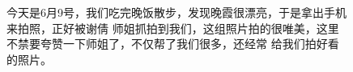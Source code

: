 \documentclass[cn,11pt,chinese]{elegantbook}
\begin{document}
\begin{figure}
    \caption{今天是6月9号，我们吃完晚饭散步，发现晚霞很漂亮，于是拿出手机来拍照，正好被谢倩
    师姐抓拍到我们，这组照片拍的很唯美，这里不禁要夸赞一下师姐了，不仅帮了我们很多，还经常
    给我们拍好看的照片。}
\end{figure}
\end{document}
